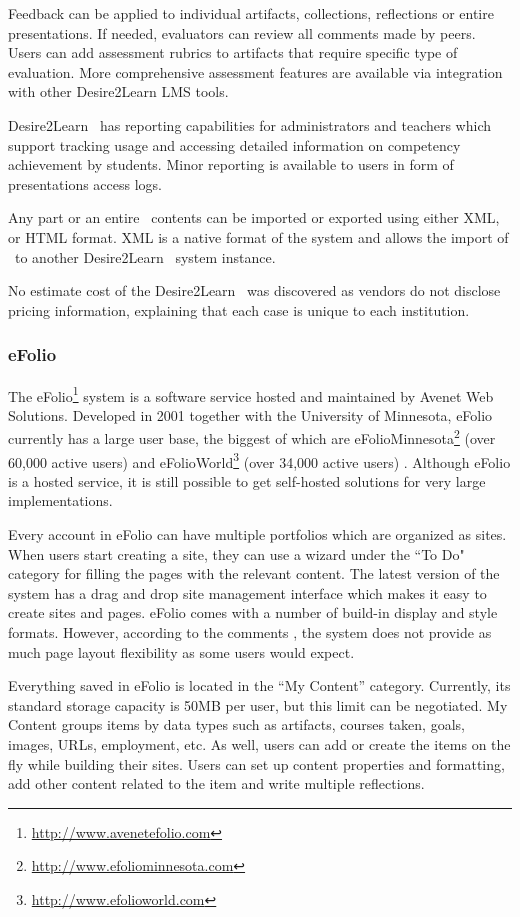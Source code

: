 Feedback can be applied to individual artifacts, collections, reflections or
entire presentations. If needed, evaluators can review all comments made by
peers. Users can add assessment rubrics to artifacts that require specific
type of evaluation. More comprehensive assessment features are available via
integration with other Desire2Learn LMS tools. 

Desire2Learn \ep~has reporting capabilities for administrators and teachers
which support tracking usage and accessing detailed information on competency
achievement by students. Minor reporting is available to users in form of
presentations access logs.

Any part or an entire \ep~contents can be imported or exported using either XML,
or HTML format. XML is a native format of the system and allows the import of
\ep~to another Desire2Learn \ep~system instance.

No estimate cost of the Desire2Learn \ep~was discovered as vendors do not
disclose pricing information, explaining that each case is unique to each
institution.
 
\subsubsection{eFolio}

The eFolio\footnote{\url{http://www.avenetefolio.com}} system is a software
service hosted and maintained by Avenet Web Solutions. Developed in 2001
together with the University of Minnesota, eFolio currently has a large user
base, the biggest of which are
eFolioMinnesota\footnote{\url{http://www.efoliominnesota.com}} (over 60,000
active users) and eFolioWorld\footnote{\url{http://www.efolioworld.com}} (over
34,000 active users) \citep{AAEEBL2011}. Although eFolio is a hosted service, it
is still possible to get self-hosted solutions for very large implementations.

Every account in eFolio can have multiple portfolios which are organized as
sites. When users start creating a site, they can use a wizard under the ``To
Do" category for filling the pages with the relevant content. The latest version
of the system has a drag and drop site management interface which makes it easy to
create sites and pages. eFolio comes with a number of build-in display and style
formats. However, according to the comments \citep{AAEEBL2011}, the system
does not provide as much page layout flexibility as some users would expect.

Everything saved in eFolio is located in the ``My Content'' category. Currently,
its standard storage capacity is 50MB per user, but this limit can be
negotiated. My Content groups items by data types such as artifacts, courses
taken, goals, images, URLs, employment, etc. As well, users can add or create
the items on the fly while building their sites. Users can set up content
properties and formatting, add other content related to the item and write
multiple reflections.

